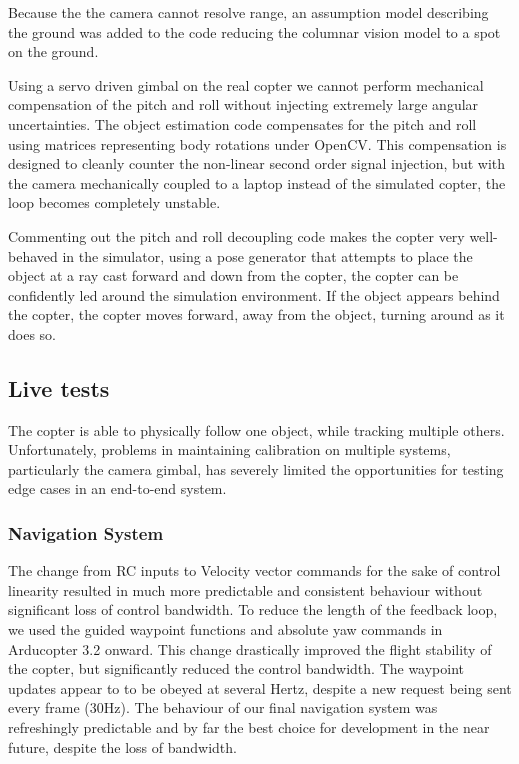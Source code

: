 \documentclass[a4paper, 11pt, titlepage]{article}
\begin{document}
    Because the the camera cannot resolve range, an assumption model describing the ground was added to the code reducing the columnar vision model to a spot on the ground.

    Using a servo driven gimbal on the real copter we cannot perform mechanical compensation of the pitch and roll without injecting extremely large angular uncertainties.
    The object estimation code compensates for the pitch and roll using matrices representing body rotations under OpenCV.
    This compensation is designed to cleanly counter the non-linear second order signal injection, but with the camera mechanically coupled to a laptop instead of the simulated copter, the loop becomes completely unstable.

    Commenting out the pitch and roll decoupling code makes the copter very well-behaved in the simulator, using a pose generator that attempts to place the object at a ray cast forward and down from the copter, the copter can be confidently led around the simulation environment.  If the object appears behind the copter, the copter moves forward, away from the object, turning around as it does so.

  \subsection{Live tests}
    The copter is able to physically follow one object, while tracking multiple others.  Unfortunately, problems in maintaining calibration on multiple systems, particularly the camera gimbal, has severely limited the opportunities for testing edge cases in an end-to-end system.

    \subsubsection{Navigation System}
      The change from RC inputs to Velocity vector commands for the sake of control linearity resulted in much more predictable and consistent behaviour without significant loss of control bandwidth.
      To reduce the length of the feedback loop, we used the guided waypoint functions and absolute yaw commands in Arducopter 3.2 onward.  This change drastically improved the flight stability of the copter, but significantly reduced the control bandwidth.  The waypoint updates appear to to be obeyed at several Hertz, despite a new request being sent every frame (30Hz).
      The behaviour of our final navigation system was refreshingly predictable and by far the best choice for development in the near future, despite the loss of bandwidth.
    
\end{document}
